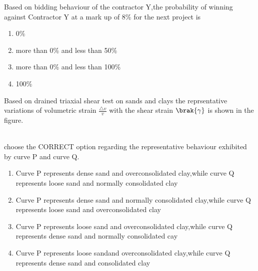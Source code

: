  Based on bidding behaviour of the contractor Y,the probability of winning against Contractor Y at a mark up of 8\% for the next project is 
 \begin{enumerate}
     \item 0\%
     \item more than 0\% and less than 50\%
     \item more than 0\% and less than 100\%
     \item 100\%
 \end{enumerate}
\bigskip
 \item Based on drained triaxial shear test on sands and clays the reprsentative variations of volumetric strain $\frac{\triangle v}{v}$ with the shear strain $\brak{\gamma}$ is shown in the figure. 
 \begin{figure}[!ht]
\centering
{}%
\end{figure}\\
choose the CORRECT option regarding the representative behaviour exhibited by curve P and curve Q.
\begin{enumerate}
    \item Curve P represents dense sand and overconsolidated clay,while curve Q represents  loose sand and normally consolidated clay
    \item Curve P represents dense sand and normally consolidated  clay,while curve Q represents  loose sand and  overconsolidated clay
    \item Curve P represents loose sand and overconsolidated clay,while curve Q represents  dense sand and normally consolidated cay
    \item Curve P represents loose sandand overconsolidated clay,while curve Q represents  dense sand and  consolidated clay
\end{enumerate}
